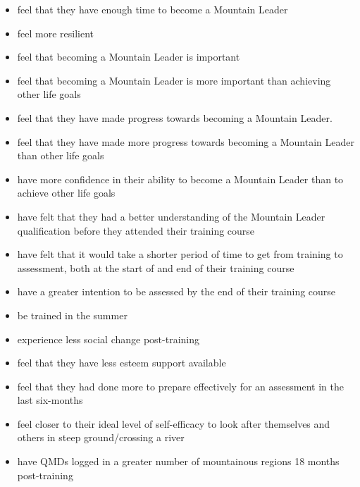 \documentclass[
  12pt,
  a4paper,
]{book}
\providecommand{\tightlist}{%
  \setlength{\itemsep}{0pt}\setlength{\parskip}{0pt}}
\begin{document}
\begin{itemize}
\tightlist
\item
  feel that they have enough time to become a Mountain Leader
\item
  feel more resilient
\item
  feel that becoming a Mountain Leader is important
\item
  feel that becoming a Mountain Leader is more important than achieving other life goals
\item
  feel that they have made progress towards becoming a Mountain Leader.
\item
  feel that they have made more progress towards becoming a Mountain Leader than other life goals
\item
  have more confidence in their ability to become a Mountain Leader than to achieve other life goals
\item
  have felt that they had a better understanding of the Mountain Leader qualification before they attended their training course
\item
  have felt that it would take a shorter period of time to get from training to assessment, both at the start of and end of their training course
\item
  have a greater intention to be assessed by the end of their training course
\item
  be trained in the summer
\item
  experience less social change post-training
\item
  feel that they have less esteem support available
\item
  feel that they had done more to prepare effectively for an assessment in the last six-months
\item
  feel closer to their ideal level of self-efficacy to look after themselves and others in steep ground/crossing a river
\item
  have QMDs logged in a greater number of mountainous regions 18 months post-training
\end{itemize}
\end{document}
